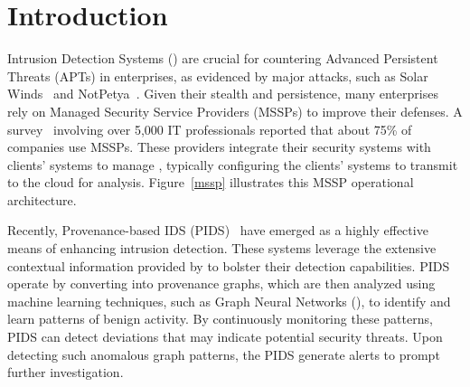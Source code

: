 \section{Introduction}
\label{s:intro}




Intrusion Detection Systems (\ids) are crucial for countering Advanced Persistent Threats (APTs) in enterprises, as evidenced by major attacks, such as Solar Winds~\cite{solarwinds} and NotPetya~\cite{notpetya}. Given their stealth and persistence, many enterprises rely on Managed Security Service Providers (MSSPs) to improve their defenses. A survey~\cite{msspsurvey} involving over 5,000 IT professionals reported that about 75\% of companies use MSSPs. These providers integrate their security systems with clients' systems to manage \logs, typically configuring the clients' systems to transmit \logs to the cloud for analysis. Figure~\ref{mssp} illustrates this MSSP operational architecture.


Recently, Provenance-based IDS (PIDS)~\cite{streamspot,provdetector2020,wang2022threatrace,shadewatcher,yangprographer,han2020unicorn} have emerged as a highly effective means of enhancing intrusion detection. These systems leverage the extensive contextual information provided by \logs to bolster their detection capabilities. PIDS operate by converting \logs into provenance graphs, which are then analyzed using machine learning techniques, such as Graph Neural Networks (\gnnshort), to identify and learn patterns of benign activity. By continuously monitoring these patterns, PIDS can detect deviations that may indicate potential security threats. Upon detecting such anomalous graph patterns, the PIDS generate alerts to prompt further investigation.


